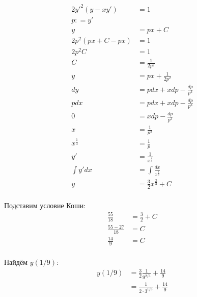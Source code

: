 \begin{align*}
    2y'^2(y-xy')       & = 1                              \\
    p : = y'                                              \\
    y                  & = px + C                         \\
    2p^2 (px + C - px) & = 1                              \\
    2p^2 C             & = 1                              \\
    C                  & = \frac{1}{2p^2}                 \\
    y                  & = px + \frac{1}{2p^2}            \\
    dy                 & = pdx + xdp - \frac{dp}{p^3}     \\
    pdx                & = pdx + xdp - \frac{dp}{p^3}     \\
    0                  & = xdp - \frac{dp}{p^3}           \\
    x                  & = \frac{1}{p^3}                  \\
    x^\frac{1}{3}      & = \frac{1}{p}                    \\
    y'                 & = \frac{1}{x^\frac{1}{3}}        \\
    \int y' dx         & = \int \frac{dx}{x^\frac{1}{3}}  \\
    y                  & = \frac{3}{2}x^{\frac{2}{3}} + C \\
\end{align*}

Подставим условие Коши:
\begin{align*}
    \frac{55}{18}      & = \frac{3}{2} + C \\
    \frac{55 - 27}{18} & = C               \\
    \frac{14}{9}       & = C               \\
\end{align*}

Найдём \(y(1 / 9)\):
\begin{align*}
    y(1 / 9) & = \frac{3}{2} \frac{1}{9^{2 / 3}} + \frac{14}{9} \\
             & = \frac{1}{2\cdot 3^{1 / 3}} + \frac{14}{9}      \\
\end{align*}

